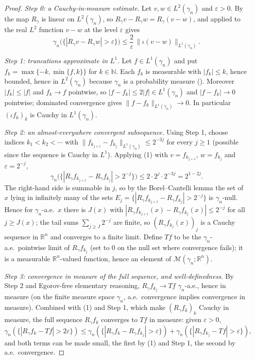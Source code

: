\begin{proof}
\emph{Step 0: a Cauchy-in-measure estimate.}
Let $v, w \in L^2(\gamma_n)$ and $\varepsilon > 0$.  By 
the map $R_\gamma$ is linear on $L^2(\gamma_n)$, so
$R_\gamma v - R_\gamma w = R_\gamma(v-w)$, and  applied to the
real $L^2$ function $v - w$ at the level $\varepsilon$ gives
\begin{equation*}
  \gamma_n\bigl(\{|R_\gamma v - R_\gamma w| > \varepsilon\}\bigr)
    \leq \frac{2}{\varepsilon}\,\|\iota(v-w)\|_{L^1(\gamma_n)} . \tag{1}
\end{equation*}

\emph{Step 1: truncations approximate in $L^1$.}
Let $f \in L^1(\gamma_n)$ and put $f_k = \max\{-k, \min\{f,k\}\}$ for
$k \in \mathbb{N}$.  Each $f_k$ is measurable with $|f_k| \leq k$, hence bounded,
hence in $L^2(\gamma_n)$ because $\gamma_n$ is a probability measure
().  Moreover $|f_k| \leq |f|$ and $f_k \to f$ pointwise, so
$|f - f_k| \leq 2|f| \in L^1(\gamma_n)$ and $|f-f_k| \to 0$ pointwise; dominated
convergence gives $\|f - f_k\|_{L^1(\gamma_n)} \to 0$.  In particular
$(\iota f_k)_k$ is Cauchy in $L^1(\gamma_n)$.

\emph{Step 2: an almost-everywhere convergent subsequence.}
Using Step 1, choose indices $k_1 < k_2 < \cdots$ with
$\|f_{k_{j+1}} - f_{k_j}\|_{L^1(\gamma_n)} \leq 2^{-3j}$ for every $j \geq 1$
(possible since the sequence is Cauchy in $L^1$).  Applying (1) with
$v = f_{k_{j+1}}$, $w = f_{k_j}$ and $\varepsilon = 2^{-j}$,
\[
  \gamma_n\bigl(\{|R_\gamma f_{k_{j+1}} - R_\gamma f_{k_j}| > 2^{-j}\}\bigr)
    \leq 2\cdot 2^{j}\cdot 2^{-3j} = 2^{1-2j} .
\]
The right-hand side is summable in $j$, so by the Borel--Cantelli lemma the set of
$x$ lying in infinitely many of the sets
$E_j = \{|R_\gamma f_{k_{j+1}} - R_\gamma f_{k_j}| > 2^{-j}\}$ is
$\gamma_n$-null.  Hence for $\gamma_n$-a.e.\ $x$ there is $J(x)$ with
$|R_\gamma f_{k_{j+1}}(x) - R_\gamma f_{k_j}(x)| \leq 2^{-j}$ for all
$j \geq J(x)$; the tail sums $\sum_{j \geq J} 2^{-j}$ are finite, so
$(R_\gamma f_{k_j}(x))_j$ is a Cauchy sequence in $\mathbb{R}^n$ and converges to
a finite limit.  Define $Tf$ to be the $\gamma_n$-a.e.\ pointwise limit of
$R_\gamma f_{k_j}$ (set to $0$ on the null set where convergence fails); it is a
measurable $\mathbb{R}^n$-valued function, hence an element of
$\mathcal{M}(\gamma_n;\mathbb{R}^n)$.

\emph{Step 3: convergence in measure of the full sequence, and well-definedness.}
By Step 2 and Egorov-free elementary reasoning, $R_\gamma f_{k_j} \to Tf$
$\gamma_n$-a.e., hence in measure (on the finite measure space $\gamma_n$,
a.e.\ convergence implies convergence in measure).  Combined with (1) and Step 1,
which make $(R_\gamma f_k)_k$ Cauchy in measure, the full sequence
$R_\gamma f_k$ converges to $Tf$ in measure: given $\varepsilon > 0$,
\[
  \gamma_n(\{|R_\gamma f_k - Tf| > 2\varepsilon\})
    \leq \gamma_n(\{|R_\gamma f_k - R_\gamma f_{k_j}| > \varepsilon\})
       + \gamma_n(\{|R_\gamma f_{k_j} - Tf| > \varepsilon\}),
\]
and both terms can be made small, the first by (1) and Step 1, the second by
a.e.\ convergence.


\end{proof}
